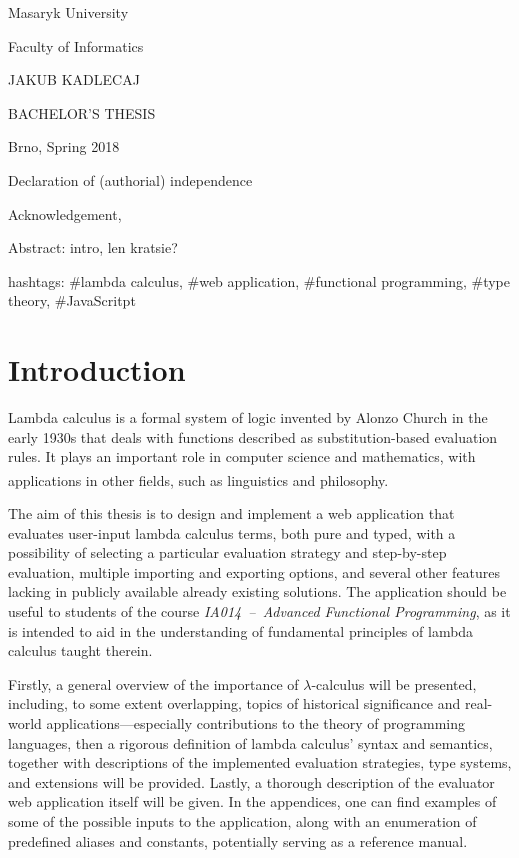 \documentclass[table, a4paper, 10pt]{book}
\newcommand{\cit}[1]{\textsuperscript{\cite{#1}}}
\begin{document}
\begin{center}
{\LARGE Masaryk University}

{\Large Faculty of Informatics}
\vspace*{7cm}

{\large JAKUB KADLECAJ}

{\Huge 
\color{brick}{Online Lambda\\Calculus Evaluator}
}
\vspace*{0.5cm}

{\large BACHELOR'S THESIS}

\vspace*{9.5cm}
{\large Brno, Spring 2018}
\end{center}

Declaration of (authorial) independence

Acknowledgement,

Abstract: intro, len kratsie?

hashtags: \#lambda calculus, \#web application,
\#functional programming, \#type theory, \#JavaScritpt
\clearpage

\tableofcontents
\newpage
{}

\chapter{Introduction}
Lambda calculus is a formal system of logic invented by Alonzo
Church in the early 1930s that deals with functions described as
substitution-based evaluation rules. It plays an important role in computer science
and mathematics, with applications in other fields, such as linguistics 
and philosophy.\cit{cardoneHindley}

The aim of this thesis is to design and implement a web application that evaluates
user-input lambda calculus terms, both pure and typed, with a possibility of
selecting a particular evaluation strategy and step-by-step evaluation, 
multiple importing and exporting options, and several other features lacking 
in publicly available already existing solutions. The application should be useful to students of
the course \textit{IA014~--~Advanced Functional Programming}, as it is intended to aid in the understanding
of fundamental principles of lambda calculus taught therein.

Firstly, a general overview of the importance of $\lambda$-calculus will be presented,
including, to some extent overlapping, topics of historical significance 
and real-world applications---especially contributions to the theory of
programming languages, then a rigorous definition of lambda calculus' syntax and semantics, together with
descriptions of the implemented evaluation strategies, type systems, and extensions will be provided.
Lastly, a thorough description of the evaluator web application itself will be given. In the appendices,
one can find examples of some of the possible inputs to the application, along with
an enumeration of predefined aliases and constants, potentially serving as a reference manual.
\end{document}
